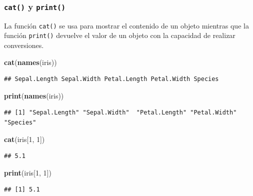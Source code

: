 \documentclass[
]{book}
\newenvironment{Shaded}{\begin{snugshade}}{\end{snugshade}}
\newcommand{\DecValTok}[1]{\textcolor[rgb]{0.00,0.00,0.81}{#1}}
\newcommand{\KeywordTok}[1]{\textcolor[rgb]{0.13,0.29,0.53}{\textbf{#1}}}
\newcommand{\NormalTok}[1]{#1}
\begin{document}
\hypertarget{l015print}{%
\subsubsection{\texorpdfstring{\texttt{cat()} y \texttt{print()}}{cat() y print()}}\label{l015print}}

La función \texttt{cat()} se usa para mostrar el contenido de un objeto mientras que la función \texttt{print()} devuelve el valor de un objeto con la capacidad de realizar conversiones.

\begin{Shaded}
\begin{Highlighting}[]
\KeywordTok{cat}\NormalTok{(}\KeywordTok{names}\NormalTok{(iris))}
\end{Highlighting}
\end{Shaded}

\begin{verbatim}
## Sepal.Length Sepal.Width Petal.Length Petal.Width Species
\end{verbatim}

\begin{Shaded}
\begin{Highlighting}[]
\KeywordTok{print}\NormalTok{(}\KeywordTok{names}\NormalTok{(iris))}
\end{Highlighting}
\end{Shaded}

\begin{verbatim}
## [1] "Sepal.Length" "Sepal.Width"  "Petal.Length" "Petal.Width"  "Species"
\end{verbatim}

\begin{Shaded}
\begin{Highlighting}[]
\KeywordTok{cat}\NormalTok{(iris[}\DecValTok{1}\NormalTok{, }\DecValTok{1}\NormalTok{])}
\end{Highlighting}
\end{Shaded}

\begin{verbatim}
## 5.1
\end{verbatim}

\begin{Shaded}
\begin{Highlighting}[]
\KeywordTok{print}\NormalTok{(iris[}\DecValTok{1}\NormalTok{, }\DecValTok{1}\NormalTok{])}
\end{Highlighting}
\end{Shaded}

\begin{verbatim}
## [1] 5.1
\end{verbatim}
\end{document}
